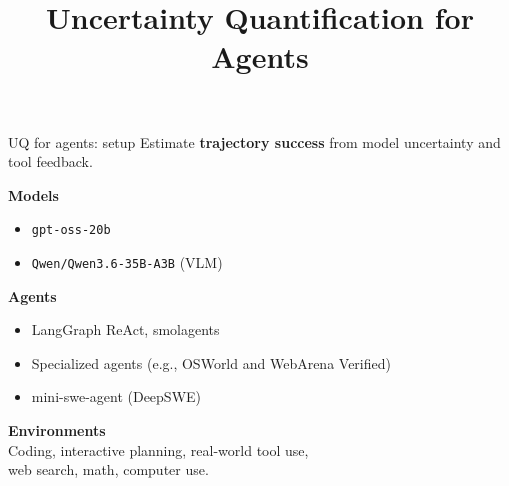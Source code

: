 \documentclass[10pt, aspectratio=43]{beamer}
\title{\textbf{Uncertainty Quantification for Agents}}
\author{}
\date{}
\begin{document}
\begin{frame}{UQ for agents: setup}
\small
Estimate \textbf{trajectory success} from model uncertainty and tool feedback.

\vspace{0.5em}
\textbf{Models}
\begin{itemize}\setlength\itemsep{2pt}
  \item \texttt{gpt-oss-20b}
  \item \texttt{Qwen/Qwen3.6-35B-A3B} (VLM)
\end{itemize}

\vspace{0.3em}
\textbf{Agents}
\begin{itemize}\setlength\itemsep{2pt}
  \item LangGraph ReAct, smolagents
  \item Specialized agents (e.g., OSWorld and WebArena Verified)
  \item mini-swe-agent (DeepSWE)
\end{itemize}

\vspace{0.3em}
\textbf{Environments}\\[3pt]
Coding, interactive planning, real-world tool use,\\
web search, math, computer use.
\end{frame}
\end{document}
